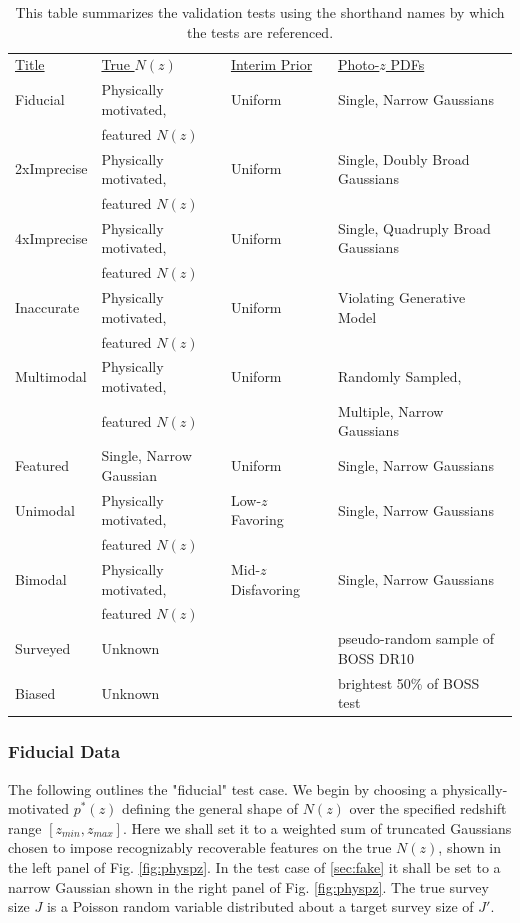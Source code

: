 \documentclass[preprint]{aastex}
\newcommand{\textul}{\underline}
\begin{document}
\begin{table}
\begin{tabular}{llll}
\textul{Title} & \textul{True $N(z)$} & \textul{Interim Prior} & 
\textul{Photo-$z$ PDFs}\\
Fiducial & Physically motivated, & Uniform & Single, Narrow Gaussians\\
& featured $N(z)$ &&\\
2xImprecise & Physically motivated, & Uniform & Single, Doubly Broad Gaussians\\
& featured $N(z)$ &&\\
4xImprecise & Physically motivated, & Uniform & Single, Quadruply Broad 
Gaussians\\
& featured $N(z)$ &&\\
Inaccurate & Physically motivated, & Uniform & Violating Generative Model\\
& featured $N(z)$ &&\\
Multimodal & Physically motivated, & Uniform & Randomly Sampled,\\
& featured $N(z)$ && Multiple, Narrow Gaussians\\
Featured & Single, Narrow Gaussian & Uniform & Single, Narrow Gaussians\\
Unimodal & Physically motivated, & Low-$z$ Favoring & Single, Narrow Gaussians\\
& featured $N(z)$ &&\\
Bimodal & Physically motivated, & Mid-$z$ Disfavoring & Single, Narrow 
Gaussians\\
& featured $N(z)$ &&\\
Surveyed & Unknown & \citet{Sheldon2012} & pseudo-random sample of BOSS DR10\\
Biased & Unknown & \citet{Sheldon2012} & brightest 50\% of BOSS test
\end{tabular}
\caption{This table summarizes the validation tests using the shorthand names 
by which the tests are referenced.}
\label{tab:key}
\end{table}

\subsubsection{Fiducial Data}
\label{sec:mock}

The following outlines the "fiducial" test case.  We begin by choosing a 
physically-motivated $p^{*}(z)$ defining the general shape of $N(z)$ over the 
specified redshift range $[z_{min},z_{max}]$.  Here we shall set it to a 
weighted sum of truncated Gaussians chosen to impose recognizably recoverable 
features on the true $N(z)$, shown in the left panel of Fig. \ref{fig:physpz}.  
In the test case of \ref{sec:fake} it shall be set to a narrow Gaussian shown 
in the right panel of Fig. \ref{fig:physpz}.  The true survey size $J$ is a 
Poisson random variable distributed about a target survey size of $J'$.
\end{document}
